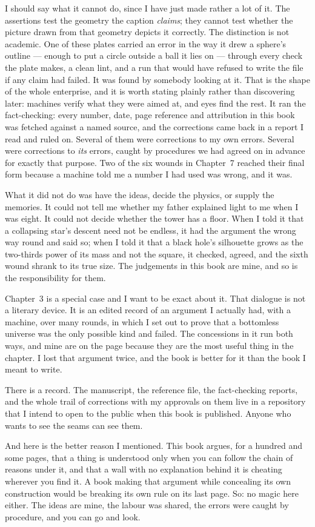 I should say what it cannot do, since I have just made rather a lot of it. The assertions test the geometry the caption \emph{claims}; they cannot test whether the picture drawn from that geometry depicts it correctly. The distinction is not academic. One of these plates carried an error in the way it drew a sphere's outline --- enough to put a circle outside a ball it lies on --- through every check the plate makes, a clean lint, and a run that would have refused to write the file if any claim had failed. It was found by somebody looking at it. That is the shape of the whole enterprise, and it is worth stating plainly rather than discovering later: machines verify what they were aimed at, and eyes find the rest. It ran the fact-checking: every number, date, page reference and attribution in this book was fetched against a named source, and the corrections came back in a report I read and ruled on. Several of them were corrections to my own errors. Several were corrections to \emph{its} errors, caught by procedures we had agreed on in advance for exactly that purpose. Two of the six wounds in Chapter~7 reached their final form because a machine told me a number I had used was wrong, and it was.

What it did not do was have the ideas, decide the physics, or supply the memories. It could not tell me whether my father explained light to me when I was eight. It could not decide whether the tower has a floor. When I told it that a collapsing star's descent need not be endless, it had the argument the wrong way round and said so; when I told it that a black hole's silhouette grows as the two-thirds power of its mass and not the square, it checked, agreed, and the sixth wound shrank to its true size. The judgements in this book are mine, and so is the responsibility for them.

Chapter~3 is a special case and I want to be exact about it. That dialogue is not a literary device. It is an edited record of an argument I actually had, with a machine, over many rounds, in which I set out to prove that a bottomless universe was the only possible kind and failed. The concessions in it run both ways, and mine are on the page because they are the most useful thing in the chapter. I lost that argument twice, and the book is better for it than the book I meant to write.

There is a record. The manuscript, the reference file, the fact-checking reports, and the whole trail of corrections with my approvals on them live in a repository that I intend to open to the public when this book is published. Anyone who wants to see the seams can see them.

And here is the better reason I mentioned. This book argues, for a hundred and some pages, that a thing is understood only when you can follow the chain of reasons under it, and that a wall with no explanation behind it is cheating wherever you find it. A book making that argument while concealing its own construction would be breaking its own rule on its last page. So: no magic here either. The ideas are mine, the labour was shared, the errors were caught by procedure, and you can go and look.

